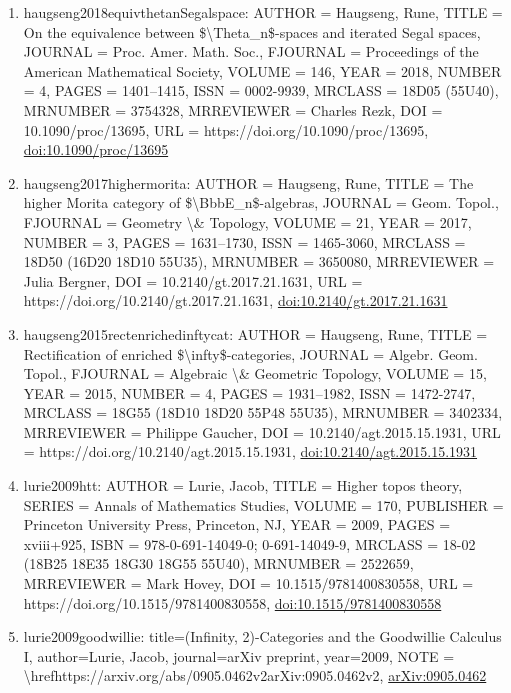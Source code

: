 \documentclass[11pt]{article}
\begin{document}
\begin{enumerate}[leftmargin=*]
  \item haugseng2018equivthetanSegalspace: AUTHOR = Haugseng, Rune, TITLE = On the equivalence between \$\textbackslash{}Theta\_n\$-spaces and iterated Segal spaces, JOURNAL = Proc. Amer. Math. Soc., FJOURNAL = Proceedings of the American Mathematical Society, VOLUME = 146, YEAR = 2018, NUMBER = 4, PAGES = 1401--1415, ISSN = 0002-9939, MRCLASS = 18D05 (55U40), MRNUMBER = 3754328, MRREVIEWER = Charles Rezk, DOI = 10.1090/proc/13695, URL = https://doi.org/10.1090/proc/13695, \href{https://doi.org/10.1090/proc/13695}{doi:10.1090/proc/13695}
  \item haugseng2017highermorita: AUTHOR = Haugseng, Rune, TITLE = The higher Morita category of \$\textbackslash{}BbbE\_n\$-algebras, JOURNAL = Geom. Topol., FJOURNAL = Geometry \textbackslash{}\& Topology, VOLUME = 21, YEAR = 2017, NUMBER = 3, PAGES = 1631--1730, ISSN = 1465-3060, MRCLASS = 18D50 (16D20 18D10 55U35), MRNUMBER = 3650080, MRREVIEWER = Julia Bergner, DOI = 10.2140/gt.2017.21.1631, URL = https://doi.org/10.2140/gt.2017.21.1631, \href{https://doi.org/10.2140/gt.2017.21.1631}{doi:10.2140/gt.2017.21.1631}
  \item haugseng2015rectenrichedinftycat: AUTHOR = Haugseng, Rune, TITLE = Rectification of enriched \$\textbackslash{}infty\$-categories, JOURNAL = Algebr. Geom. Topol., FJOURNAL = Algebraic \textbackslash{}\& Geometric Topology, VOLUME = 15, YEAR = 2015, NUMBER = 4, PAGES = 1931--1982, ISSN = 1472-2747, MRCLASS = 18G55 (18D10 18D20 55P48 55U35), MRNUMBER = 3402334, MRREVIEWER = Philippe Gaucher, DOI = 10.2140/agt.2015.15.1931, URL = https://doi.org/10.2140/agt.2015.15.1931, \href{https://doi.org/10.2140/agt.2015.15.1931}{doi:10.2140/agt.2015.15.1931}
  \item lurie2009htt: AUTHOR = Lurie, Jacob, TITLE = Higher topos theory, SERIES = Annals of Mathematics Studies, VOLUME = 170, PUBLISHER = Princeton University Press, Princeton, NJ, YEAR = 2009, PAGES = xviii+925, ISBN = 978-0-691-14049-0; 0-691-14049-9, MRCLASS = 18-02 (18B25 18E35 18G30 18G55 55U40), MRNUMBER = 2522659, MRREVIEWER = Mark Hovey, DOI = 10.1515/9781400830558, URL = https://doi.org/10.1515/9781400830558, \href{https://doi.org/10.1515/9781400830558}{doi:10.1515/9781400830558}
  \item lurie2009goodwillie: title=(Infinity, 2)-Categories and the Goodwillie Calculus I, author=Lurie, Jacob, journal=arXiv preprint, year=2009, NOTE = \textbackslash{}hrefhttps://arxiv.org/abs/0905.0462v2arXiv:0905.0462v2, \href{https://arxiv.org/abs/0905.0462}{arXiv:0905.0462}

\end{enumerate}
\end{document}
